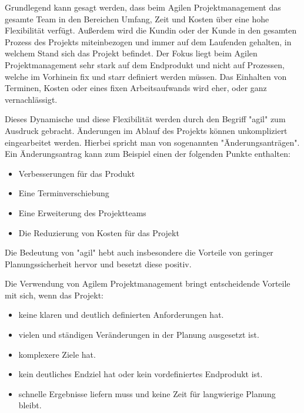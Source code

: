 \label{sec:agile}


Grundlegend kann gesagt werden, dass beim Agilen Projektmanagement das gesamte Team in den Bereichen Umfang, Zeit und Kosten über eine hohe Flexibilität verfügt. Außerdem wird die Kundin oder der Kunde in den gesamten Prozess des Projekts miteinbezogen und immer auf dem Laufenden gehalten, in welchem Stand sich das Projekt befindet. Der Fokus liegt beim Agilen Projektmanagement sehr stark auf dem Endprodukt und nicht auf Prozessen, welche im Vorhinein fix und starr definiert werden müssen. Das Einhalten von Terminen, Kosten oder eines fixen Arbeitsaufwands wird eher, oder ganz vernachlässigt. \cite{agil}

Dieses Dynamische und diese Flexibilität werden durch den Begriff "agil" zum Ausdruck gebracht. Änderungen im Ablauf des Projekts können unkompliziert eingearbeitet werden. Hierbei spricht man von sogenannten "Änderungsanträgen". Ein Änderungsantrag kann zum Beispiel einen der folgenden Punkte enthalten: \cite{agil}

\begin{itemize}
    \item Verbesserungen für das Produkt
    \item Eine Terminverschiebung
    \item Eine Erweiterung des Projektteams
    \item Die Reduzierung von Kosten für das Projekt
    \cite{Aenderung}
\end{itemize}

Die Bedeutung von "agil" hebt auch insbesondere die Vorteile von geringer Planungssicherheit hervor und besetzt diese positiv. \cite{agil} 


Die Verwendung von Agilem Projektmanagement bringt entscheidende Vorteile mit sich, wenn das Projekt:

\begin{itemize}
    \item keine klaren und deutlich definierten Anforderungen hat.
    \item vielen und ständigen Veränderungen in der Planung ausgesetzt ist.
    \item komplexere Ziele hat.
    \item kein deutliches Endziel hat oder kein vordefiniertes Endprodukt ist.
    \item schnelle Ergebnisse liefern muss und keine Zeit für langwierige Planung bleibt.
\end{itemize}

